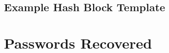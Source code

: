 \documentclass[12pt]{article}
\begin{document}
\subsection{Example Hash Block Template}

\pagebreak
\section{Passwords Recovered}




%

\pagebreak
\end{document}

